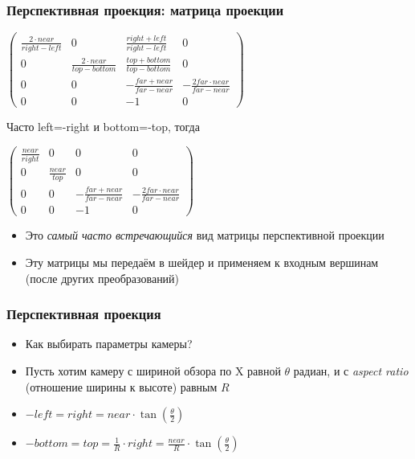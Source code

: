 \documentclass[10pt]{beamer}
\begin{document}
\begin{frame}[fragile]
\frametitle{Перспективная проекция: матрица проекции}
\begin{center}
\begin{math}
\begin{pmatrix}
\frac{2\cdot near}{right - left} & 0 & \frac{right + left}{right - left} & 0 \\
0 & \frac{2\cdot near}{top - bottom} & \frac{top + bottom}{top - bottom} & 0 \\
0 & 0 & -\frac{far + near}{far - near} & -\frac{2 far \cdot near}{far - near} \\
0 & 0 & -1 & 0
\end{pmatrix}
\end{math}
\end{center}

\pause
Часто left=-right и bottom=-top, тогда

\begin{center}
\begin{math}
\begin{pmatrix}
\frac{near}{right} & 0 & 0 & 0 \\
0 & \frac{near}{top} & 0 & 0 \\
0 & 0 & -\frac{far + near}{far - near} & -\frac{2 far \cdot near}{far - near} \\
0 & 0 & -1 & 0
\end{pmatrix}
\end{math}
\end{center}
\begin{itemize}
\item Это \textit{самый часто встречающийся} вид матрицы перспективной проекции
\pause
\item Эту матрицы мы передаём в шейдер и применяем к входным вершинам (после других преобразований)
\end{itemize}
\end{frame}

\begin{frame}[fragile]
\frametitle{Перспективная проекция}
\begin{itemize}
\item Как выбирать параметры камеры?
\pause
\item Пусть хотим камеру с шириной обзора по X равной \begin{math}\theta\end{math} радиан, и с \textit{aspect ratio} (отношение ширины к высоте) равным \begin{math}R\end{math}
\pause
\item \begin{math}-left=right=near \cdot \tan\left(\frac{\theta}{2}\right)\end{math}
\item \begin{math}-bottom=top=\frac{1}{R} \cdot right = \frac{near}{R} \cdot \tan\left(\frac{\theta}{2}\right)\end{math}
\end{itemize}
\end{frame}
\end{document}
